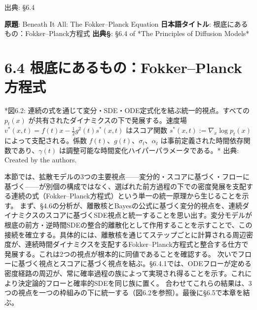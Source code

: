 

{\color{gray}\footnotesize 出典: §6.4\par}
\vspace{0.2em}
\begin{propositionbox}[原題]
\textbf{原題}: Beneath It All: The Fokker–Planck Equation
\textbf{日本語タイトル}: 根底にあるもの：Fokker–Planck方程式
\textbf{出典§}: §6.4 of *The Principles of Diffusion Models*
\end{propositionbox}


\section*{6.4 根底にあるもの：Fokker–Planck方程式}




*図6.2: 連続の式を通じて変分・SDE・ODE定式化を結ぶ統一的視点。すべての $p_t(x)$ が共有されたダイナミクスの下で発展する。速度場 $v^*(x,t)=f(t)x-\frac{1}{2}g^2(t)s^*(x,t)$ はスコア関数 $s^*(x,t):=\nabla_x\log p_t(x)$ によって支配される。係数 $f(t)$、$g(t)$、$\sigma_t$、$\alpha_t$ は事前定義された時間依存関数であり、$\gamma(t)$ は調整可能な時間変化ハイパーパラメータである。*
出典: Created by the authors.

本節では、拡散モデルの3つの主要視点——変分的・スコアに基づく・フローに基づく——が別個の構成ではなく、選ばれた前方過程の下での密度発展を支配する連続の式（Fokker–Planck方程式）という単一の統一原理から生じることを示す。
まず、§4.6の分析が、離散核とBayesの公式に基づく変分的視点を、連続ダイナミクスのスコアに基づくSDE視点と統一することを思い出す。変分モデルが根底の前方・逆時間SDEの整合的離散化として作用することを示すことで、この接続を確立する。具体的には、離散核を通じてステップごとに計算される周辺密度が、連続時間ダイナミクスを支配するFokker–Planck方程式と整合する仕方で発展する。これは2つの視点が根本的に同値であることを確認する。
次いでフローに基づく視点とスコアに基づく視点を結ぶ。§6.4.1では、ODEフローが定める密度経路の周辺が、常に確率過程の族によって実現され得ることを示す。これにより決定論的フローと確率的SDEを同じ族に置く。
合わせてこれらの結果は、3つの視点を一つの枠組みの下に統一する（図6.2を参照）。最後に§6.5で本章を結ぶ。

